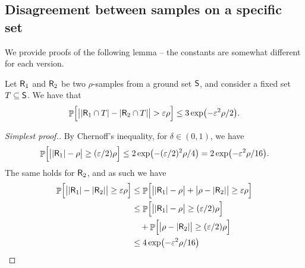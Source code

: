\subsection{Disagreement between samples on a specific set}


We provide  proofs of the following lemma -- the constants are
somewhat different for each version.
\begin{lemma}
    Let $\mathsf{R}_1$ and $\mathsf{R}_2$ be two $\rho$-samples from a
    ground set $\mathsf{S}$, and consider a fixed set $T \subseteq
    \mathsf{S}$. We have that 
    \begin{equation*}
        \Prob{\Bigl.
           \cardin{\bigl.\cardin{\Sample_1 \cap \SetB} - \cardin{\Sample_2
                 \cap \SetB} }%
           > %
           \eps \rho
        }%
        \leq %
        3 \exp\pth{ -   \eps^2 \rho/2 }.
    \end{equation*}
\end{lemma}

\begin{proof}[Simplest proof.]
    By Chernoff's inequality, for $\delta \in (0,1)$, we have
    \begin{equation*}
        \Prob{ \Bigl.\cardin{\bigl.\cardin{\Sample_1} - \rho}
           \geq (\eps/2) \rho } %
        \leq %
        2 \exp\pth{ - (\eps/2)^2 \rho /4 }
        = %
        2 \exp\pth{ - \eps^2 \rho /16 }.
    \end{equation*}
    The same holds for $\mathsf{R}_2$, and as such we have
    \begin{align*}
      \Prob{ \Bigl.\cardin{\bigl.\cardin{\Sample_1} - \cardin{\Sample_2}}
      \geq \eps \rho } %
      &\leq %
        \Prob{ \Bigl.\cardin{\bigl.\cardin{\Sample_1} -\rho }
        + \cardin{\bigl.\rho - \cardin{\Sample_2}}
        \geq \eps \rho } %
      \\&
      \leq
      \Prob{ \Bigl.\cardin{\bigl.\cardin{\Sample_1} -\rho }
      \geq (\eps/2)\rho}
      \\&\quad
      +
      \Prob{ \Bigl.
      \cardin{\bigl.\rho - \cardin{\Sample_2}}
      \geq (\eps/2) \rho } %
      \\&
      \leq %
      4 \exp\pth{ - \eps^2 \rho /16 }
    \end{align*}       
\end{proof}

